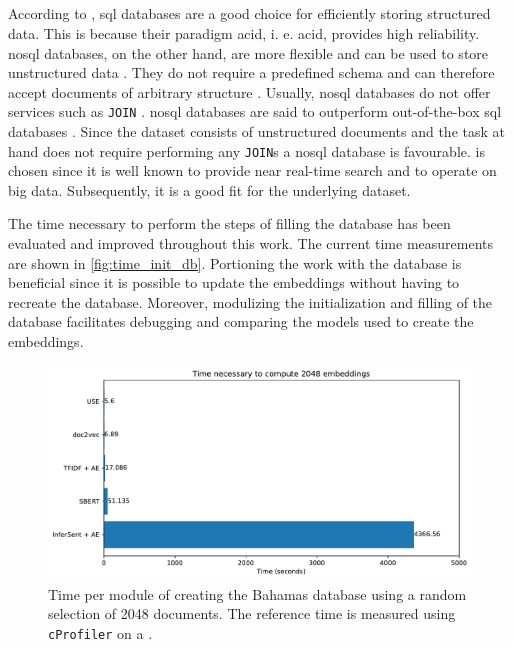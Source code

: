 \subsection*{\databaseName{}}\label{subsec:evaluation-db}
According to \citeauthor{flask_book2018}, \ac{sql} databases are a good choice for efficiently storing structured data.
This is because their paradigm \acs{acid}, i. e. \acl{acid}, provides high reliability.
\ac{nosql} databases, on the other hand, are more flexible and can be used to store unstructured data \cite{flask_book2018}.
They do not require a predefined schema and can therefore accept documents of arbitrary structure \cite{flask2018}.
Usually, \ac{nosql} databases do not offer services such as \texttt{JOIN} \cite{flask2018}.
\ac{nosql} databases are said to outperform out-of-the-box \ac{sql} databases \cite{flask2018}.
Since the dataset consists of unstructured documents and the task at hand does not require performing any \texttt{JOIN}s a \ac{nosql} database is favourable.
\databaseName{} is chosen since it is well known to provide near real-time search and to operate on big data.
Subsequently, it is a good fit for the underlying dataset.

The time necessary to perform the steps of filling the \databaseName{} database has been evaluated and improved throughout this work.
The current time measurements are shown in \autoref{fig:time_init_db}.
Portioning the work with the database is beneficial since it is possible to update the embeddings without having to recreate the database.
Moreover, modulizing the initialization and filling of the database facilitates debugging and comparing the models used to create the embeddings.

\begin{figure}[!htb] %
    \centering
    \includegraphics[width=1\textwidth]{images/Elasticsearch/Time_necessary_to_compute_2048_embeddings.pdf}
    \caption[Times for creating the database]{Time per module of creating the Bahamas database using a random selection of 2048 documents.
    The reference time is measured using \texttt{cProfiler} on a \localMaschineStats{}.
    }
    \label{fig:time_init_db}
\end{figure}

